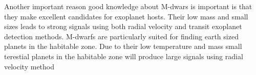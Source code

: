 \documentclass[a4paper]{article}
\begin{document}
Another important reason good knowledge about M-dwars is important is that they make excellent candidates for exoplanet hosts. Their low mass and small sizes leads to strong signals using both radial velocity and transit exoplanet detection methods. M-dwarfs are particularly suited for finding earth sized planets in the habitable zone. Due to their low temperature and mass small terestial planets in the habitable zone will produce large signals using radial velocity method \cite{2018A&A...609A.117T}













\printbibliography
\end{document}
